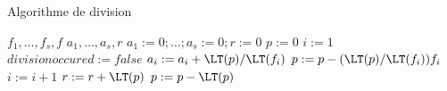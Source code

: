 \begin{algorithm}

\caption{Algorithme de division}

\begin{algorithmic}
\REQUIRE $f_1,\ldots,f_s,f$
\ENSURE $a_1,\ldots,a_s,r$
\STATE $a_1 :=0 ;\ldots ; a_s:=0 ; r:=0$
\STATE $p:=0$
\STATE $i:=1$
\STATE $divisionoccured:=false $
\STATE $a_i:= a_i+\LT (p)/\LT (f_i)$
\STATE $p:=p-(\LT(p)/\LT (f_i)) f_i$
\ELSE
\STATE $i:=i+1$
\ENDIF
\ENDWHILE
{}
\STATE $r:=r+\LT (p)$
\STATE $p:=p-\LT (p) $
\ENDIF
\ENDWHILE
\end{algorithmic}

\end{algorithm}